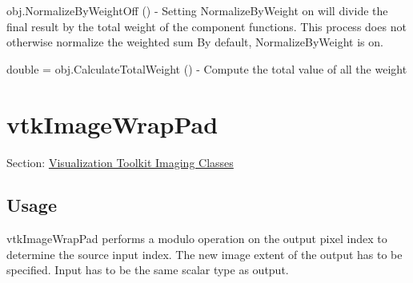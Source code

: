\begin{DoxyItemize}
\item {\ttfamily obj.\-Normalize\-By\-Weight\-Off ()} -\/ Setting Normalize\-By\-Weight on will divide the final result by the total weight of the component functions. This process does not otherwise normalize the weighted sum By default, Normalize\-By\-Weight is on.  
\item {\ttfamily double = obj.\-Calculate\-Total\-Weight ()} -\/ Compute the total value of all the weight  
\end{DoxyItemize}\hypertarget{vtkimaging_vtkimagewrappad}{}\section{vtk\-Image\-Wrap\-Pad}\label{vtkimaging_vtkimagewrappad}
Section\-: \hyperlink{sec_vtkimaging}{Visualization Toolkit Imaging Classes} \hypertarget{vtkwidgets_vtkxyplotwidget_Usage}{}\subsection{Usage}\label{vtkwidgets_vtkxyplotwidget_Usage}
vtk\-Image\-Wrap\-Pad performs a modulo operation on the output pixel index to determine the source input index. The new image extent of the output has to be specified. Input has to be the same scalar type as output.

